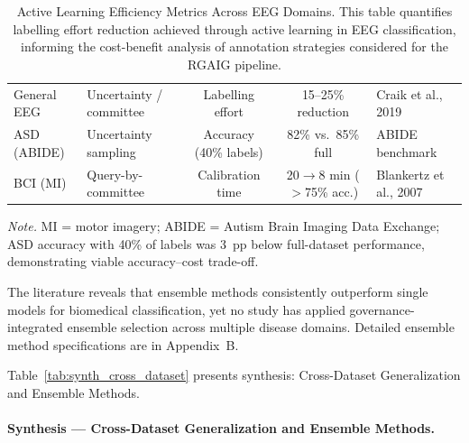 \begin{table}[H]
\tablestripes\tablefontsize
\caption[Active Learning Efficiency Metrics Across EEG Domains]{Active Learning Efficiency Metrics Across EEG Domains. This table quantifies labelling effort reduction achieved through active learning in EEG classification, informing the cost-benefit analysis of annotation strategies considered for the RGAIG pipeline.}
\tablefontsize
\begin{tabularx}{\textwidth}{@{} >{\raggedright\arraybackslash}p{2cm} >{\raggedright\arraybackslash}p{3cm} C C L @{}}
\toprule
{} &  &  &  &  \\
\midrule
General EEG & Uncertainty / committee & Labelling effort & 15--25\% reduction & Craik et al., 2019 \\
\addlinespace
ASD (ABIDE) & Uncertainty sampling & Accuracy (40\% labels) & 82\% vs.\ 85\% full & ABIDE benchmark \\
\addlinespace
BCI (MI) & Query-by-committee & Calibration time & 20$\to$8 min ($>$75\% acc.) & Blankertz et al., 2007 \\
\bottomrule
\end{tabularx}
\vspace{0.5em}\noindent\textit{Note.} MI = motor imagery; ABIDE = Autism Brain Imaging Data Exchange;  ASD accuracy with 40\% of labels was 3~pp below full-dataset performance, demonstrating viable accuracy--cost trade-off.
\end{table}

\fi %


\noindent The literature reveals that ensemble methods consistently outperform single models for biomedical classification, yet no study has applied governance-integrated ensemble selection across multiple disease domains. Detailed ensemble method specifications are in Appendix~B.



\noindent Table~\ref{tab:synth_cross_dataset} presents synthesis: Cross-Dataset Generalization and Ensemble Methods.

\paragraph{Synthesis --- Cross-Dataset Generalization and Ensemble Methods.}




